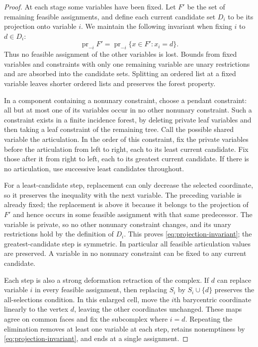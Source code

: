 \documentclass[11pt,reqno]{amsart}
\theoremstyle{plain}
\theoremstyle{definition}
\theoremstyle{remark}
\begin{document}
\begin{proof}
At each stage some variables have been fixed. Let $F'$ be the set of
remaining feasible assignments, and define each current candidate set
$D_i$ to be its projection onto variable $i$. We maintain the following
invariant when fixing $i$ to $d\in D_i$:
\begin{equation}\label{eq:projection-invariant}
\operatorname{pr}_{-i}F'
 =\operatorname{pr}_{-i}\{x\in F':x_i=d\}.
\end{equation}
Thus no feasible assignment of the other variables is lost.
Bounds from fixed variables and constraints with only one remaining
variable are unary restrictions and are absorbed into the candidate
sets. Splitting an ordered list at a fixed variable leaves shorter
ordered lists and preserves the forest property.

In a component containing a nonunary constraint, choose a pendant
constraint: all but at most one of its variables occur in no other
nonunary constraint. Such a constraint exists in a finite incidence
forest, by deleting private leaf variables and then taking a leaf
constraint of the remaining tree. Call the possible shared variable the
articulation. In the order of this constraint, fix the private variables
before the articulation from left to right, each to its least current
candidate. Fix those after it from right to left, each to its greatest
current candidate. If there is no articulation, use successive least
candidates throughout.

For a least-candidate step, replacement can only decrease the selected
coordinate, so it preserves the inequality with the next variable.
The preceding variable is already fixed; the replacement is above it
because it belongs to the projection of $F'$ and hence occurs in some
feasible assignment with that same predecessor. The variable is private,
so no other nonunary constraint changes, and its unary restrictions hold
by the definition of $D_i$. This proves \eqref{eq:projection-invariant};
the greatest-candidate step is symmetric. In particular all feasible
articulation values are preserved. A variable in no nonunary constraint
can be fixed to any current candidate.

Each step is also a strong deformation retraction of the complex.
If $d$ can replace variable $i$ in every feasible assignment, then
replacing $S_i$ by $S_i\cup\{d\}$ preserves the all-selections
condition. In this enlarged cell, move the $i$th barycentric coordinate
linearly to the vertex $d$, leaving the other coordinates unchanged.
These maps agree on common faces and fix the subcomplex where $i=d$.
Repeating the elimination removes at least one variable at each step,
retains nonemptiness by \eqref{eq:projection-invariant}, and ends at a
single assignment.
\end{proof}
\end{document}
